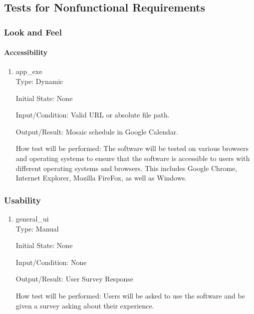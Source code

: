 \documentclass[12pt, titlepage]{article}
\begin{document}
\subsection{Tests for Nonfunctional Requirements}

\subsubsection{Look and Feel}
		
\paragraph{Accessibility}

\begin{enumerate}

\color{blue}\item{app\_exe\\}\color{black}
Type: Dynamic
					
Initial State: None
					
Input/Condition: Valid URL or absolute file path.
					
Output/Result: Mosaic schedule in Google Calendar.
					
How test will be performed: The software will be tested on various browsers and operating systems to ensure that the software is accessible to users with different operating systems and browsers. This includes Google Chrome, Internet Explorer, Mozilla FireFox, as well as Windows. %
	
\end{enumerate}

\subsubsection{Usability}

\begin{enumerate}

\color{blue}\item{general\_ui\\}\color{black}
Type: Manual
					
Initial State: None
					
Input/Condition: None
					
Output/Result: User Survey Response
					
How test will be performed: Users will be asked to use the software and be given a survey asking about their experience. 

\end{enumerate}
\end{document}

